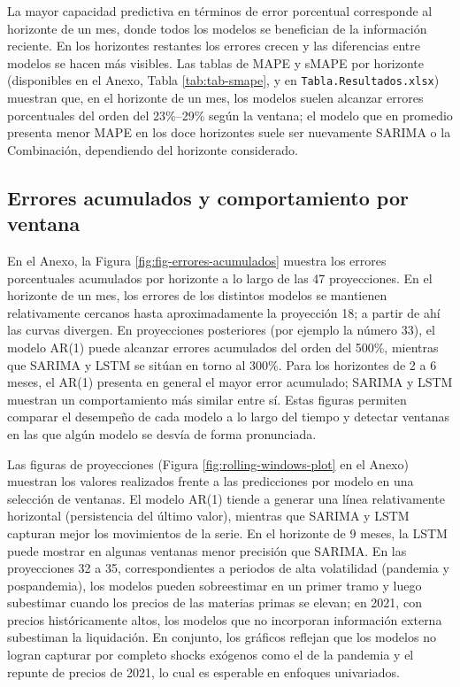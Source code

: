 \documentclass[
  12pt, a4paper, oneside]{article}
\begin{document}
La mayor capacidad predictiva en términos de error porcentual corresponde al horizonte de un mes, donde todos los modelos se benefician de la información reciente. En los horizontes restantes los errores crecen y las diferencias entre modelos se hacen más visibles. Las tablas de MAPE y sMAPE por horizonte (disponibles en el Anexo, Tabla \ref{tab:tab-smape}, y en \texttt{Tabla.Resultados.xlsx}) muestran que, en el horizonte de un mes, los modelos suelen alcanzar errores porcentuales del orden del 23\%--29\% según la ventana; el modelo que en promedio presenta menor MAPE en los doce horizontes suele ser nuevamente SARIMA o la Combinación, dependiendo del horizonte considerado.

\subsection{Errores acumulados y comportamiento por ventana}\label{errores-acumulados-y-comportamiento-por-ventana}

En el Anexo, la Figura \ref{fig:fig-errores-acumulados} muestra los errores porcentuales acumulados por horizonte a lo largo de las 47 proyecciones. En el horizonte de un mes, los errores de los distintos modelos se mantienen relativamente cercanos hasta aproximadamente la proyección 18; a partir de ahí las curvas divergen. En proyecciones posteriores (por ejemplo la número 33), el modelo AR(1) puede alcanzar errores acumulados del orden del 500\%, mientras que SARIMA y LSTM se sitúan en torno al 300\%. Para los horizontes de 2 a 6 meses, el AR(1) presenta en general el mayor error acumulado; SARIMA y LSTM muestran un comportamiento más similar entre sí. Estas figuras permiten comparar el desempeño de cada modelo a lo largo del tiempo y detectar ventanas en las que algún modelo se desvía de forma pronunciada.

Las figuras de proyecciones (Figura \ref{fig:rolling-windows-plot} en el Anexo) muestran los valores realizados frente a las predicciones por modelo en una selección de ventanas. El modelo AR(1) tiende a generar una línea relativamente horizontal (persistencia del último valor), mientras que SARIMA y LSTM capturan mejor los movimientos de la serie. En el horizonte de 9 meses, la LSTM puede mostrar en algunas ventanas menor precisión que SARIMA. En las proyecciones 32 a 35, correspondientes a periodos de alta volatilidad (pandemia y pospandemia), los modelos pueden sobreestimar en un primer tramo y luego subestimar cuando los precios de las materias primas se elevan; en 2021, con precios históricamente altos, los modelos que no incorporan información externa subestiman la liquidación. En conjunto, los gráficos reflejan que los modelos no logran capturar por completo shocks exógenos como el de la pandemia y el repunte de precios de 2021, lo cual es esperable en enfoques univariados.
\end{document}

